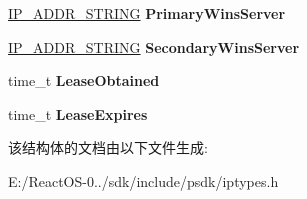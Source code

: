 \begin{DoxyCompactItemize}
\hyperlink{struct___i_p___a_d_d_r___s_t_r_i_n_g}{I\+P\+\_\+\+A\+D\+D\+R\+\_\+\+S\+T\+R\+I\+NG} {\bfseries Primary\+Wins\+Server}
\item 
\mbox{\label{struct___i_p___a_d_a_p_t_e_r___i_n_f_o_a19b549fec86d90a8467954b7bf507896}} 
\hyperlink{struct___i_p___a_d_d_r___s_t_r_i_n_g}{I\+P\+\_\+\+A\+D\+D\+R\+\_\+\+S\+T\+R\+I\+NG} {\bfseries Secondary\+Wins\+Server}
\item 
\mbox{\label{struct___i_p___a_d_a_p_t_e_r___i_n_f_o_a8a16f7eb9c1cf1209b9e826c68001035}} 
time\+\_\+t {\bfseries Lease\+Obtained}
\item 
\mbox{\label{struct___i_p___a_d_a_p_t_e_r___i_n_f_o_a9d5a24035a958536cb84bebd91560a68}} 
time\+\_\+t {\bfseries Lease\+Expires}
\end{DoxyCompactItemize}


该结构体的文档由以下文件生成\+:\begin{DoxyCompactItemize}
\item 
E\+:/\+React\+O\+S-\/0../sdk/include/psdk/iptypes.\+h\end{DoxyCompactItemize}
